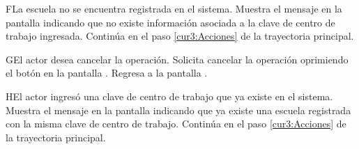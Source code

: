  \begin{UCtrayectoriaA}{F}{La escuela no se encuentra registrada en el sistema.}
    \UCpaso[\UCsist] Muestra el mensaje  en la pantalla  indicando que no existe información asociada a la clave de centro de trabajo ingresada.
   \UCpaso[] Continúa en el paso \ref{cur3:Acciones} de la trayectoria principal.
  \end{UCtrayectoriaA}

 \begin{UCtrayectoriaA}{G}{El actor desea cancelar la operación.}
    \UCpaso[\UCactor] Solicita cancelar la operación oprimiendo el botón  en la pantalla .
    \UCpaso[\UCsist] Regresa a la pantalla .
 \end{UCtrayectoriaA}

 \begin{UCtrayectoriaA}{H}{El actor ingresó una clave de centro de trabajo que ya existe en el sistema.}
    \UCpaso[\UCsist] Muestra el mensaje  en la pantalla  indicando que ya existe una escuela registrada con la misma clave de centro de trabajo.
   \UCpaso[] Continúa en el paso \ref{cur3:Acciones} de la trayectoria principal.
 \end{UCtrayectoriaA}
